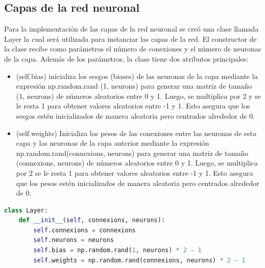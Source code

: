 \documentclass{article}
\begin{document}
    \subsection{Capas de la red neuronal}\label{subsec:capas-de-la-red-neuronal}
    Para la implementación de las capas de la red neuronal se creó una clase llamada Layer
    la cual será utilizada para instanciar las capas de la red.
    El constructor de la clase recibe como parámetros el número de conexiones y el número de neuronas de la capa.
    \newline
    Además de los parámetros, la clase tiene dos atributos principales:
    \begin{itemize}
        \item (self.bias) inicializa los sesgos (biases) de las neuronas de la capa mediante la expresión
        np.random.rand (1, neurons) para generar una matriz de tamaño (1, neurons) de números aleatorios entre 0 y 1.
        Luego, se multiplica por 2 y se le resta 1 para obtener valores aleatorios entre -1 y 1.
        Esto asegura que los sesgos estén inicializados de manera aleatoria pero centrados alrededor de 0.

        \item (self.weights) Inicializa los pesos de las conexiones entre las neuronas de esta capa
        y las neuronas de la capa anterior mediante la expresión np.random.rand(connexions, neurons)
        para generar una matriz de tamaño (connexions, neurons) de números aleatorios entre 0 y 1.
        Luego, se multiplica por 2 se le resta 1 para obtener valores aleatorios entre -1 y 1.
        Esto asegura que los pesos estén inicializados de manera aleatoria pero centrados alrededor de 0.
    \end{itemize}
    \begin{lstlisting}[language=Python, caption={Capa de la red neuronal}, label={lst:neural_layer}]
class Layer:
    def __init__(self, connexions, neurons):
        self.connexions = connexions
        self.neurons = neurons
        self.bias = np.random.rand(1, neurons) * 2 - 1
        self.weights = np.random.rand(connexions, neurons) * 2 - 1
    \end{lstlisting}
    \clearpage
\end{document}
